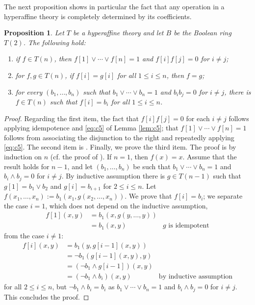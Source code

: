 \documentclass{amsart}
\numberwithin{equation}{section}
\theoremstyle{plain}
\newtheorem{proposition}[theorem]{Proposition}
\theoremstyle{definition}
\begin{document}
The next proposition shows in particular the fact that any operation in a hyperaffine theory 
is completely determined by 
its coefficients.   

\begin{proposition}
  \label{prop:coord2}
  Let $T$ be a hyperaffine theory and let $B$ be the Boolean ring $T(2)$.  
  The following hold: 
  \begin{enumerate}
    \item if $f \in T(n)$, then $f[1] \lor \cdots \lor f[n] =1$ and $f[i]f[j]=0$ for $i \neq j$; 
    \item for $f,g \in T(n)$, if $f[i]=g[i]$ for all $1 \le i \le n$, then $f=g$; 
    \item for every $(b_1, \ldots, b_n)$ such that $b_1 \lor \cdots \lor b_n =1$ and $b_i b_j =0$ for $i \neq j$, there is $f \in T(n)$ such that $f[i]=b_i$ for all $1 \le i \le n$. 
  \end{enumerate}
\end{proposition}
\begin{proof}
  Regarding the first item, the fact that $f[i] f[j]=0$ for each $i \neq j$ follows applying idempotence and \eqref{eq:c5} of Lemma \ref{lem:c5}; 
    that $f[1] \lor \cdots \lor f[n]=1$
    follows from associating the disjunction to the right and repeatedly applying \eqref{eq:c5}.  
  The second item is \cite[Lemma 4.6(i)]{G24}. 
  Finally, we prove the third item. 
  The proof is by induction on $n$ (cf. the proof of \cite[Proposition 4.7]{G24}).  
  If $n=1$, then $f(x)=x$. 
  Assume that the result holds for $n-1$, and let $(b_1, \ldots, b_n)$ be such that $b_1 \lor \cdots \lor b_n =1$ and $b_i \land b_j =0$ for $i \neq j$.   
  By inductive assumption there is $g \in T(n-1)$ such that $g[1]=b_1 \lor b_2$ and $g[i]=b_{i+1}$ for $2 \le i \le n$.
  Let $f(x_1, \ldots, x_n):=b_1(x_1, g(x_2, \ldots, x_n))$. 
  We prove that $f[i]=b_i$; we separate the case $i=1$, which does not depend on the inductive assumption,
  \begin{align*}
    f[1](x,y) & = b_1(x,g(y,\ldots,y)) & \\
    & = b_1(x,y) & g \text{ is idempotent} 
  \end{align*}
  from the case $i\neq1$:
  \begin{align*}
    f[i](x,y) & = b_1(y,g[i-1](x,y)) & \\
    & = \lnot b_1 (g[i-1](x,y),y) & \\
    & = (\lnot b_1 \land g[i-1])(x,y) &  \\
    & = (\lnot b_1 \land b_i)(x,y) & \text{by inductive assumption}
  \end{align*}
  for all $2 \le i \le n$, but $\lnot b_1 \land b_i =b_i$ as $b_1 \lor \cdots \lor b_n =1$ and $b_i \land  b_j =0$ for $i \neq j$. 
  This concludes the proof. 
\end{proof}
\end{document}
